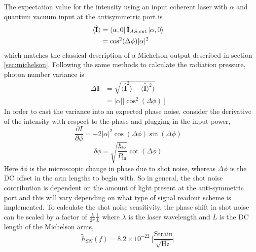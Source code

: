 		The expectation value for the intensity using an input coherent laser with $\alpha$ and quantum vacuum input at the antisymmetric port is
		\begin{equation}
		\begin{aligned}
		\langle \hat{\mathbf{I}} \rangle 	&= \bra{\alpha,0} \hat{\mathbf{I}}_{AS,\text{out}} \ket{\alpha,0}\\
							&= \cos^2(\Delta \phi) \vert \alpha \vert^2
		\end{aligned}
		\end{equation}
		which matches the classical description of a Michelson output described in section \ref{sec:michelson}. Following the same methods to calculate the radiation pressure, photon number variance is
		\begin{equation} 
		\begin{aligned}
		\Delta \mathbf{I} 	&= \sqrt{\langle \mathbf{\hat{I}}^2 \rangle  - \langle \mathbf{\hat{I}} \rangle^2)} \\
							&= \vert \alpha \vert \big[ \cos^2(\Delta \phi)\ \big] 
		\end{aligned}
		\end{equation}
		In order to cast the variance into an expected phase noise, consider the derivative of the intensity with respect to the phase and plugging in the input power,
		\begin{equation}
		\frac{\partial I}{\partial \phi} = - 2 \vert \alpha \vert^2\cos(\Delta \phi) \sin(\Delta \phi)
		\end{equation}
		\begin{equation}
		\delta \phi = \sqrt{\frac{\hbar \omega}{ P_{\text{in}}}} \cot(\Delta \phi)
		\end{equation}
		Here $\delta \phi$ is the microscopic change in phase due to shot noise, whereas $\Delta\phi$ is the DC offset in the arm lengths to begin with. So in general, the shot noise contribution is dependent on the amount of light present at the anti-symmetric port and this will vary depending on what type of signal readout scheme is implemented.  To calculate the shot noise sensitivity, the phase shift in shot noise can be scaled by a factor of $\frac{\lambda}{2 \pi}\frac{1}{L}$ where $\lambda$ is the laser wavelength and $L$ is the DC length of the Michelson arms,
		\begin{equation}
		\tilde{h}_{SN}(f) = 8.2\times 10^{-22} \; \bigg[ \frac{\text{Strain}}{\sqrt{\text{Hz}}}\bigg]
		\end{equation}
